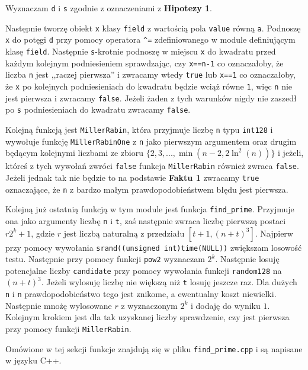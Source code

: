 \documentclass{article}
\begin{document}
Wyznaczam \texttt{d} i \texttt{s} zgodnie z oznaczeniami z \textbf{Hipotezy 1}.

Następnie tworzę obiekt \texttt{x} klasy \texttt{field} z wartością pola \texttt{value} równą \texttt{a}.
Podnoszę \texttt{x} do potęgi \texttt{d} przy pomocy operatora \verb!^!\texttt{=} zdefiniowanego w module definiującym klasę \texttt{field}.
Następnie \texttt{s}-krotnie podnoszę w miejscu \texttt{x} do kwadratu przed każdym kolejnym podniesieniem sprawdzając, czy \texttt{x==n-1} 
co oznaczałoby, że liczba \texttt{n} jest ,,raczej pierwsza'' i zwracamy wtedy \texttt{true} lub \texttt{x==1} co oznaczałoby, że \texttt{x} po kolejnych podniesieniach do kwadratu
będzie wciąż równe \texttt{1}, więc \texttt{n} nie jest pierwsza i zwracamy \texttt{false}. Jeżeli żaden z tych warunków nigdy nie zaszedł 
po \texttt{s} podniesieniach do kwadratu zwracamy \texttt{false}.

Kolejną funkcją jest \texttt{MillerRabin}, która przyjmuje liczbę \texttt{n} typu \texttt{\texttt{\textunderscore \textunderscore int128}} i 
wywołuje funkcję \texttt{MillerRabinOne} z \texttt{n} jako pierwszym argumentem oraz drugim będącym kolejnymi liczbami ze zbioru
$\{2,3,...,\min(n-2, 2\ln^2(n))\}$ i jeżeli, któreś z tych wywołań zwróci \texttt{false} funkcja \texttt{MillerRabin} również 
zwraca \texttt{false}. Jeżeli jednak tak nie będzie to na podstawie \textbf{Faktu 1} zwracamy \texttt{true} oznaczające, że 
\texttt{n} z bardzo małym prawdopodobieństwem błędu jest pierwsza. 

Kolejną już ostatnią funkcją w tym module jest funkcja \texttt{find\_prime}. Przyjmuje ona jako argumenty liczbę \texttt{n} i 
\texttt{t}, zaś następnie zwraca liczbę pierwszą postaci $r2^k+1$, gdzie $r$ jest liczbą naturalną z przedziału $[t+1,(n+t)^3]$.
Najpierw przy pomocy wywołania \texttt{srand((unsigned int)time(NULL))} zwiększam losowość testu. 
Następnie przy pomocy funkcji \texttt{pow2} wyznaczam $2^k$. Następnie losuję potencjalne liczby \texttt{candidate} przy pomocy wywołania
funkcji \texttt{random128} na $(n+t)^3$. Jeżeli wylosuję liczbę nie większą niż \texttt{t} losuję jeszcze raz. Dla dużych \texttt{n} i \texttt{n}
prawdopodobieństwo tego jest znikome, a ewentualny koszt niewielki. Następnie mnożę
wylosowane $r$ z wyznaczonym $2^k$ i dodaję do wyniku $1$. Kolejnym krokiem jest dla tak uzyskanej liczby sprawdzenie, czy 
jest pierwsza przy pomocy funkcji \texttt{MillerRabin}.

Omówione w tej sekcji funkcje znajdują się w pliku \texttt{find\_prime.cpp} i są napisane w języku C++.
\end{document}
